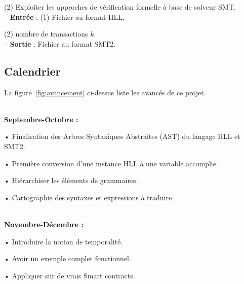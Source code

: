 \documentclass{article}
\begin{document}
\hspace{2.15cm}(2) Exploiter les approches de vérification formelle à base de solveur SMT.\\


-- \textbf{Entrée} : (1) Fichier au format HLL,

\hspace{1.75cm} (2) nombre de transactions $k$.\\

-- \textbf{Sortie} : Fichier au format SMT2.


\subsection{Calendrier}
La figure~\ref{fig:avancement} ci-dessus liste les avancés de ce projet.


\hspace{-0.5cm}\\
\textbf{Septembre-Octobre :}

• Finalisation des Arbres Syntaxiques Abstraites (AST) du langage HLL et SMT2.

• Première conversion d'une instance HLL à une variable accomplie.

• Hiérarchiser les éléments de grammaires.

• Cartographie des syntaxes et expressions à traduire.

\hspace{-0.5cm}\\
\textbf{Novembre-Décembre :}

• Introduire la notion de temporalité.

• Avoir un exemple complet fonctionnel.

• Appliquer sur de vrais Smart contracts.







\end{document}
